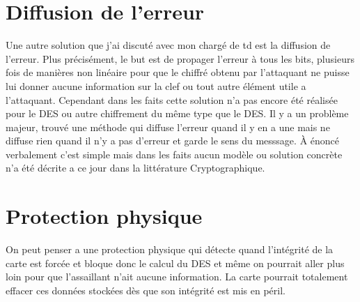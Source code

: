 \documentclass[a4paper]{report}
\begin{document}
			\section{Diffusion de l'erreur}
				Une autre solution que j'ai discuté avec mon chargé de td est la diffusion de l'erreur. Plus précisément, le but est de propager l'erreur à tous les bits, plusieurs fois de manières non linéaire pour que le chiffré obtenu par l'attaquant ne puisse lui donner aucune information sur la clef ou tout autre élément utile a l'attaquant.
				Cependant dans les faits cette solution n'a pas encore été réalisée pour le DES ou autre chiffrement du même type que le DES. Il y a un problème majeur, trouvé une méthode qui diffuse l'erreur quand il y en a une mais ne diffuse rien quand il n'y a pas d'erreur et garde le sens du messsage. À énoncé verbalement c'est simple mais dans les faits aucun modèle ou solution concrète n'a été décrite a ce jour dans la littérature Cryptographique.
			\section{Protection physique}
			On peut penser a une protection physique qui détecte quand l'intégrité de la carte est forcée et bloque donc le calcul du DES et même on pourrait aller plus loin pour que l'assaillant n'ait aucune information. La carte pourrait totalement effacer ces données stockées dès que son intégrité est mis en péril.
\end{document}
